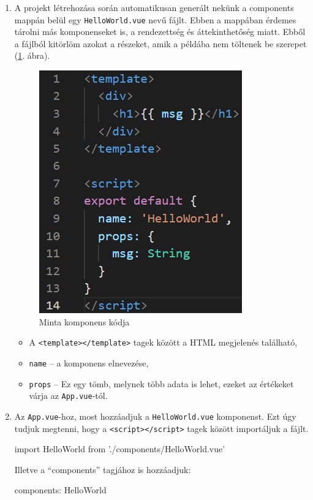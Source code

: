 \begin{enumerate}
	\item A projekt létrehozása során automatikusan generált nekünk a components mappán belül egy \texttt{HelloWorld.vue} nevű fájlt. Ebben a mappában érdemes tárolni más komponenseket is, a rendezettség és áttekinthetőség miatt. Ebből a fájlból kitörlöm azokat a részeket, amik a példába nem töltenek be szerepet (\ref{fig:hello}. ábra).
	
	\begin{figure}[h!]
	\centering
	\includegraphics[scale=0.5]{images/14dfb7fd47c01c0cd6d8692ca740c349.png}
	\caption{Minta komponens kódja}
	\label{fig:hello}
	\end{figure}

	\begin{itemize}
		\item A \texttt{<template></template>} tagek között a HTML megjelenés található,
		\item \texttt{name} -- a komponens elnevezése,
		\item \texttt{props} -- Ez egy tömb, melynek több adata is lehet, ezeket az értékeket várja az \texttt{App.vue}-tól.
	\end{itemize}
	\item Az \texttt{App.vue}-hoz, most hozzáadjuk a \texttt{HelloWorld.vue} komponenst. Ezt úgy tudjuk megtenni, hogy a \texttt{<script></script>} tagek között importáljuk a fájlt.
\begin{javascript}
import HelloWorld from './components/HelloWorld.vue'
\end{javascript}
	Illetve a “components” tagjához is hozzáadjuk:
\begin{javascript}
components: {
  HelloWorld
}
\end{javascript}


\end{enumerate}
